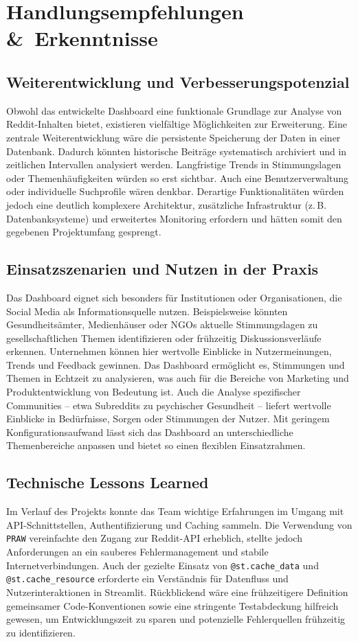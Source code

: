 \section{Handlungsempfehlungen \&~Erkenntnisse}
\label{sec:erkenntnisse}

\subsection{Weiterentwicklung und Verbesserungspotenzial}
Obwohl das entwickelte Dashboard eine funktionale Grundlage zur Analyse von Reddit-Inhalten bietet, existieren vielfältige Möglichkeiten zur Erweiterung. Eine zentrale Weiterentwicklung wäre die persistente Speicherung der Daten in einer Datenbank. Dadurch könnten historische Beiträge systematisch archiviert und in zeitlichen Intervallen analysiert werden. Langfristige Trends in Stimmungslagen oder Themenhäufigkeiten würden so erst sichtbar. Auch eine Benutzerverwaltung oder individuelle Suchprofile wären denkbar. Derartige Funktionalitäten würden jedoch eine deutlich komplexere Architektur, zusätzliche Infrastruktur (z.\,B. Datenbanksysteme) und erweitertes Monitoring erfordern und hätten somit den gegebenen Projektumfang gesprengt.

\subsection{Einsatzszenarien und Nutzen in der Praxis}
Das Dashboard eignet sich besonders für Institutionen oder Organisationen, die Social Media als Informationsquelle nutzen. Beispielsweise könnten Gesundheitsämter, Medienhäuser oder NGOs aktuelle Stimmungslagen zu gesellschaftlichen Themen identifizieren oder frühzeitig Diskussionsverläufe erkennen. Unternehmen können hier wertvolle Einblicke in Nutzermeinungen, Trends und Feedback gewinnen. Das Dashboard ermöglicht es, Stimmungen und Themen in Echtzeit zu analysieren, was auch für die Bereiche von Marketing und Produktentwicklung von Bedeutung ist.
Auch die Analyse spezifischer Communities – etwa Subreddits zu psychischer Gesundheit – liefert wertvolle Einblicke in Bedürfnisse, Sorgen oder Stimmungen der Nutzer. Mit geringem Konfigurationsaufwand lässt sich das Dashboard an unterschiedliche Themenbereiche anpassen und bietet so einen flexiblen Einsatzrahmen.

\subsection{Technische Lessons Learned}
Im Verlauf des Projekts konnte das Team wichtige Erfahrungen im Umgang mit API-Schnittstellen, Authentifizierung und Caching sammeln. Die Verwendung von \texttt{PRAW} vereinfachte den Zugang zur Reddit-API erheblich, stellte jedoch Anforderungen an ein sauberes Fehlermanagement und stabile Internetverbindungen. Auch der gezielte Einsatz von \texttt{@st.cache\_data} und \texttt{@st.cache\_resource} erforderte ein Verständnis für Datenfluss und Nutzerinteraktionen in Streamlit. Rückblickend wäre eine frühzeitigere Definition gemeinsamer Code-Konventionen sowie eine stringente Testabdeckung hilfreich gewesen, um Entwicklungszeit zu sparen und potenzielle Fehlerquellen frühzeitig zu identifizieren.